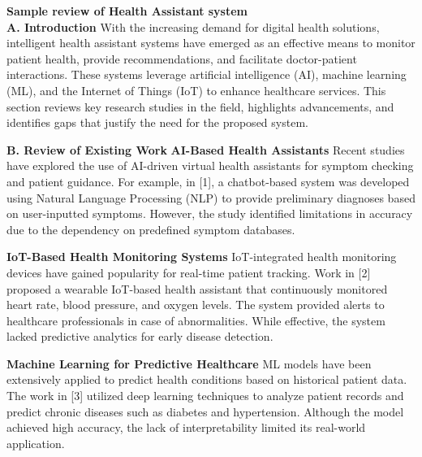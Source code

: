 \textbf{Sample review of Health Assistant system }
\\\textbf{A. Introduction}
With the increasing demand for digital health solutions, intelligent health assistant systems have emerged as an effective means to monitor patient health, provide recommendations, and facilitate doctor-patient interactions. These systems leverage artificial intelligence (AI), machine learning (ML), and the Internet of Things (IoT) to enhance healthcare services. This section reviews key research studies in the field, highlights advancements, and identifies gaps that justify the need for the proposed system.

\textbf{B. Review of Existing Work}
\textbf{AI-Based Health Assistants}
Recent studies have explored the use of AI-driven virtual health assistants for symptom checking and patient guidance. For example, in [1], a chatbot-based system was developed using Natural Language Processing (NLP) to provide preliminary diagnoses based on user-inputted symptoms. However, the study identified limitations in accuracy due to the dependency on predefined symptom databases.

\textbf{IoT-Based Health Monitoring Systems}
IoT-integrated health monitoring devices have gained popularity for real-time patient tracking. Work in [2] proposed a wearable IoT-based health assistant that continuously monitored heart rate, blood pressure, and oxygen levels. The system provided alerts to healthcare professionals in case of abnormalities. While effective, the system lacked predictive analytics for early disease detection.

\textbf{Machine Learning for Predictive Healthcare}
ML models have been extensively applied to predict health conditions based on historical patient data. The work in [3] utilized deep learning techniques to analyze patient records and predict chronic diseases such as diabetes and hypertension. Although the model achieved high accuracy, the lack of interpretability limited its real-world application.

